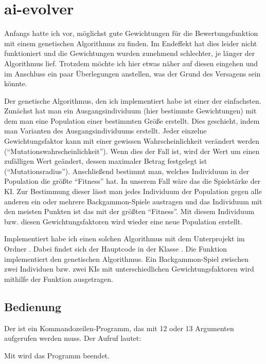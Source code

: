 {{\section{ai-evolver} \label{sec:ai-evolver}
Anfangs hatte ich vor, möglichst gute Gewichtungen für die Bewertungsfunktion mit einem genetischen Algorithmus zu finden. Im Endeffekt hat dies leider nicht funktioniert und die Gewichtungen wurden zunehmend schlechter, je länger der Algorithmus lief. Trotzdem möchte ich hier etwas näher auf diesen eingehen und im Anschluss ein paar Überlegungen anstellen, was der Grund des Versagens sein könnte.

Der genetische Algorithmus, den ich implementiert habe ist einer der einfachsten. Zunächst hat man ein Ausgangsindividuum (hier bestimmte Gewichtungen) mit dem man eine Population einer bestimmten Größe erstellt. Dies geschieht, indem man Varianten des Ausgangsindividuums erstellt. Jeder einzelne Gewichtungsfaktor kann mit einer gewissen Wahrscheinlichkeit verändert werden ("`Mutationswahrscheinlichkeit"'). Wenn dies der Fall ist, wird der Wert um einen zufälligen Wert geändert, dessen maximaler Betrag festgelegt ist ("`Mutationsradius"'). Anschließend bestimmt man, welches Individuum in der Population die größte "`Fitness"' hat. In unserem Fall wäre das die Spielstärke der KI. Zur Bestimmung dieser lässt man jedes Individuum der Population gegen alle anderen ein oder mehrere Backgammon-Spiele austragen und das Individuum mit den meisten Punkten ist das mit der größten "`Fitness"'. Mit diesem Individuum bzw. diesen Gewichtungsfaktoren wird wieder eine neue Population erstellt.

Implementiert habe ich einen solchen Algorithmus mit dem Unterprojekt  im Ordner . Dabei findet sich der Hauptcode in der Klasse . Die Funktion  implementiert den genetischen Algorithmus. Ein Backgammon-Spiel zwischen zwei Individuen bzw. zwei KIs mit unterschiedlichen Gewichtungsfaktoren wird mithilfe der Funktion  ausgetragen.

\subsection{Bedienung} \label{sec:ai-evolver:usage}
Der  ist ein Kommandozeilen-Programm, das mit 12 oder 13 Argumenten aufgerufen werden muss. Der Aufruf lautet:

Mit  wird das Programm beendet.

}}
